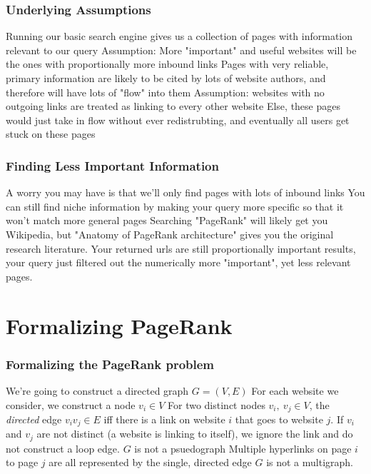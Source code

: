 \documentclass{beamer}
\begin{document}
\begin{frame}[t]
\frametitle{Underlying Assumptions}    
\begin{outline}
    \1 Running our basic search engine gives us a collection of pages with information relevant to our query
    \1 Assumption: More "important" and useful websites will be the ones with proportionally more inbound links
    \1 Pages with very reliable, primary information are likely to be cited by lots of website authors, and therefore will have lots of "flow" into them
    \1 Assumption: websites with no outgoing links are treated as linking to every other website
    \1 Else, these pages would just take in flow without ever redistrubting, and eventually all users get stuck on these pages
\end{outline}
\end{frame}

\begin{frame}[t]
\frametitle{Finding Less Important Information}
\begin{outline}
    \1 A worry you may have is that we'll only find pages with lots of inbound links
    \1 You can still find niche information by making your query more specific so that it won't match more general pages
    \1 Searching "PageRank" will likely get you Wikipedia, but "Anatomy of PageRank architecture" gives you the original research literature. 
    \1 Your returned urls are still proportionally important results, your query just filtered out the numerically more "important", yet less relevant pages.
\end{outline}
\end{frame}

\section{Formalizing PageRank}
\begin{frame}[t]
\frametitle{Formalizing the PageRank problem}
\begin{outline}
    \1 We're going to construct a directed graph $G = (V, E)$
    \1 For each website we consider, we construct a node $v_i \in V$
    \1 For two distinct nodes $v_i,\ v_j \in V$, the \emph{directed} edge $v_iv_j \in E$ iff there is a link on website $i$ that goes to website $j$.
    \1 If $v_i$ and $v_j$ are not distinct (a website is linking to itself), we ignore the link and do not construct a loop edge.
        \2 $G$ is not a psuedograph
    \1 Multiple hyperlinks on page $i$ to page $j$ are all represented by the single, directed edge 
        \2 $G$ is not a multigraph.
\end{outline}
\end{frame}
\end{document}
